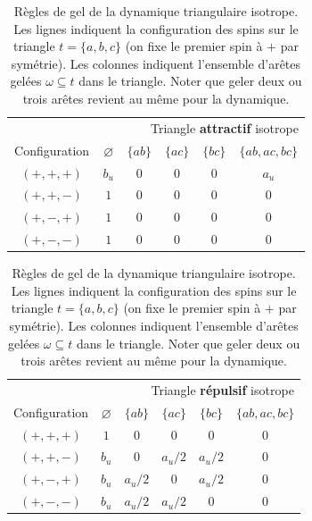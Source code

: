 

\begin{table}[H]
\centering
\begin{tabular}{c|ccccc}
\toprule
\multicolumn{6}{c}{\TriangleAttractif{} \ \ \ \ \ \  \ \ \ \ \ \  \ \ \ \ \ \  \ \ \ \ Triangle \textbf{attractif} isotrope}\\
Configuration & $\varnothing$ & $\{ab\}$ & $\{ac\}$ & $\{bc\}$ & $\{ab,ac,bc\}$\\
\midrule
$(+,+,+)$ & $b_u$ & $0$ & $0$ & $0$ & $a_u$\\
$(+,+,-)$ & $1$ & $0$ & $0$ & $0$ & $0$\\
$(+,-,+)$ & $1$ & $0$ & $0$ & $0$ & $0$\\
$(+,-,-)$ & $1$ & $0$ & $0$ & $0$ & $0$\\
\bottomrule
\end{tabular}
\qquad
\begin{tabular}{c|ccccc}
\toprule
\multicolumn{6}{c}{\TriangleRepulsif{} \ \ \ \ \ \  \ \ \ \ \ \  \ \ \ \ \ \   \ \ \ \ Triangle \textbf{répulsif} isotrope}\\
Configuration & $\varnothing$ & $\{ab\}$ & $\{ac\}$ & $\{bc\}$ & $\{ab,ac,bc\}$\\
\midrule
$(+,+,+)$ & $1$ & $0$ & $0$ & $0$ & $0$\\
$(+,+,-)$ & $b_u$ & $0$ & $a_u/2$ & $a_u/2$ & $0$\\
$(+,-,+)$ & $b_u$ & $a_u/2$ & $0$ & $a_u/2$ & $0$\\
$(+,-,-)$ & $b_u$ & $a_u/2$ & $a_u/2$ & $0$ & $0$\\
\bottomrule
\end{tabular}
\caption{Règles de gel de la dynamique \SW{} triangulaire isotrope. Les lignes indiquent la configuration des spins sur le triangle $ t = \{a,b,c\}$ (on fixe le premier spin à $+$ par symétrie). Les colonnes indiquent l'ensemble d'arêtes gelées $\omega \subseteq t$ dans le triangle. Noter que geler deux ou trois arêtes revient au même pour la dynamique.}
\label{tab:chapII_triangle_dynamics}
\end{table}


